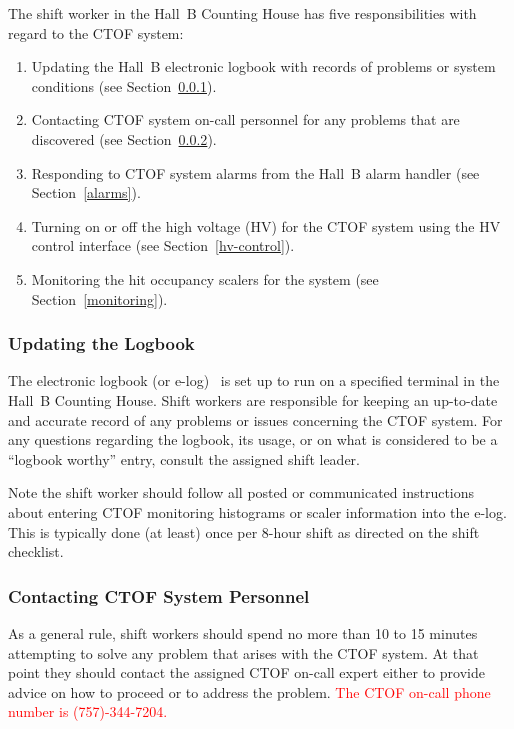 \documentclass[12pt]{article}
\begin{document}
The shift worker in the Hall~B Counting House has five responsibilities with regard to the CTOF system:

\begin{enumerate}
\item Updating the Hall~B electronic logbook with records of problems or system conditions (see
Section~\ref{logbook}).

\item Contacting CTOF system on-call personnel for any problems that are discovered (see Section~\ref{contact}).

\item Responding to CTOF system alarms from the Hall~B alarm handler (see Section~\ref{alarms}).

\item Turning on or off the high voltage (HV) for the CTOF system using the HV control interface (see
Section~\ref{hv-control}).

\item Monitoring the hit occupancy scalers for the system (see Section~\ref{monitoring}).
\end{enumerate}

\subsubsection{Updating the Logbook}
\label{logbook}

The electronic logbook (or e-log)~\cite{e-log} is set up to run on a specified terminal in the Hall~B Counting
House. Shift workers are responsible for keeping an up-to-date and accurate record of any problems or
issues concerning the CTOF system. For any questions regarding the logbook, its usage, or on what is 
considered to be a ``logbook worthy'' entry, consult the assigned shift leader.

Note the shift worker should follow all posted or communicated instructions about entering CTOF monitoring
histograms or scaler information into the e-log. This is typically done (at least) once per 8-hour shift as
directed on the shift checklist.

\subsubsection{Contacting CTOF System Personnel}
\label{contact}

As a general rule, shift workers should spend no more than 10 to 15 minutes attempting to solve any problem
that arises with the CTOF system. At that point they should contact the assigned CTOF on-call expert either
to provide advice on how to proceed or to address the problem. \textcolor{red}{The CTOF on-call phone 
number is (757)-344-7204.}
\end{document}
